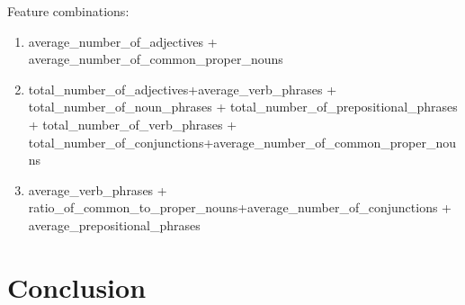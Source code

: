 \documentclass[]{article}
\begin{document}
Feature combinations:

\begin{enumerate}
	\item  average\_number\_of\_adjectives + average\_number\_of\_common\_proper\_nouns
	\item total\_number\_of\_adjectives+average\_verb\_phrases + total\_number\_of\_noun\_phrases + total\_number\_of\_prepositional\_phrases + total\_number\_of\_verb\_phrases + total\_number\_of\_conjunctions+average\_number\_of\_common\_proper\_nouns
	\item average\_verb\_phrases + ratio\_of\_common\_to\_proper\_nouns+average\_number\_of\_conjunctions + average\_prepositional\_phrases
\end{enumerate}

\section{Conclusion}


\printbibliography
\end{document}
